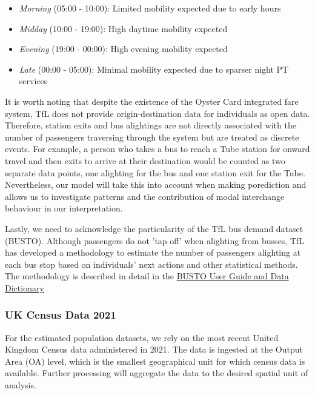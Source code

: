 \begin{itemize}
    \setlength\itemsep{-0.2em}
    \item \textit{Morning} (05:00 - 10:00): Limited mobility expected due to early hours
    \item \textit{Midday} (10:00 - 19:00): High daytime mobility expected
    \item \textit{Evening} (19:00 - 00:00): High evening mobility expected
    \item \textit{Late} (00:00 - 05:00): Minimal mobility expected due to sparser night PT services
\end{itemize}

It is worth noting that despite the existence of the Oyster Card integrated fare system, TfL does not provide origin-destination data for individuals as open data. Therefore, station exits and bus alightings are not directly associated with the number of passengers traversing through the system but are treated as discrete events. For example, a person who takes a bus to reach a Tube station for onward travel and then exits to arrive at their destination would be counted as two separate data points, one alighting for the bus and one station exit for the Tube. Nevertheless, our model will take this into account when making porediction and allows us to investigate patterns and the contribution of modal interchange behaviour in our interpretation.

Lastly, we need to acknowledge the particularity of the TfL bus demand dataset (BUSTO). Although passengers do not 'tap off' when alighting from busses, TfL has developed a methodology to estimate the number of passengers alighting at each bus stop based on individuals' next actions and other statistical methods. The methodology is described in detail in the \href{http://crowding.data.tfl.gov.uk/BUSTO/BUSTO\%20User\%20Guide\%20and\%20Data\%20Dictionary\%20v1.0.pdf}{BUSTO User Guide and Data Dictionary}

\subsubsection*{UK Census Data 2021}
For the estimated population datasets, we rely on the most recent United Kingdom Census data administered in 2021. The data is ingested at the Output Area (OA) level, which is the smallest geographical unit for which census data is available. Further processing will aggregate the data to the desired spatial unit of analysis.

